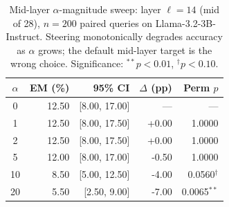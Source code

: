 \begin{table}[htbp]
\caption{Mid-layer $\alpha$-magnitude sweep: layer $\ell\!=\!14$ (mid of 28), $n\!=\!200$ paired queries on Llama-3.2-3B-Instruct. Steering monotonically degrades accuracy as $\alpha$ grows; the default mid-layer target is the wrong choice. Significance: $^{\ast\ast}p<0.01$, $^{\dagger}p<0.10$.}
\label{tab:alpha-sweep}
\centering\renewcommand{\arraystretch}{1.15}
\begin{tabular}{c r r r r}
\toprule
$\alpha$ & EM (\%) & 95\% CI & $\Delta$ (pp) & Perm $p$ \\
\midrule
0 & 12.50 & [8.00, 17.00] & --- & --- \\
1 & 12.50 & [8.00, 17.50] & +0.00 & 1.0000 \\
2 & 12.50 & [8.00, 17.50] & +0.00 & 1.0000 \\
5 & 12.00 & [8.00, 17.00] & -0.50 & 1.0000 \\
10 & 8.50 & [5.00, 12.50] & -4.00 & 0.0560$^{\dagger}$ \\
20 & 5.50 & [2.50, 9.00] & -7.00 & 0.0065$^{\ast\ast}$ \\
\bottomrule\end{tabular}\end{table}
